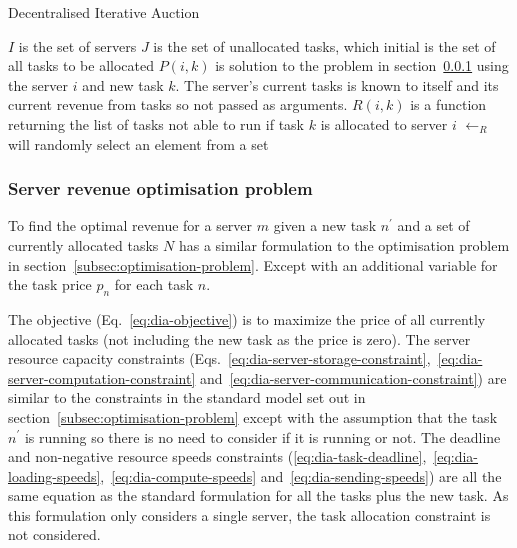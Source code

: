 \begin{algorithm}
    \caption{Decentralised Iterative Auction}
    \label{alg:dia}
    \begin{algorithmic}
        \REQUIRE $I$ is the set of servers
        \REQUIRE $J$ is the set of unallocated tasks, which initial is the set of all tasks to be allocated
        \REQUIRE $P(i, k)$ is solution to the problem in section~\ref{subsubsec:decentralised-iterative-problem}
        using the server $i$ and new task $k$.
        The server's current tasks is known to itself and its current revenue from tasks so not passed as arguments.
        \REQUIRE $R(i, k)$ is a function returning the list of tasks not able to run if task $k$ is allocated to server $i$
        \REQUIRE $\leftarrow_R$ will randomly select an element from a set
                \ENDFOR
            \ENDIF
        \ENDWHILE
    \end{algorithmic}
\end{algorithm}

\subsubsection{Server revenue optimisation problem}
\label{subsubsec:decentralised-iterative-problem}
To find the optimal revenue for a server $m$ given a new task $n^{'}$ and a set of currently allocated tasks $N$ has a
similar formulation to the optimisation problem in section~\ref{subsec:optimisation-problem}. Except with an additional
variable for the task price $p_n$ for each task $n$.

The objective (Eq.~\eqref{eq:dia-objective}) is to maximize the price of all currently allocated tasks (not including
the new task as the price is zero). The server resource capacity constraints
(Eqs.~\eqref{eq:dia-server-storage-constraint},~\eqref{eq:dia-server-computation-constraint}
and~\eqref{eq:dia-server-communication-constraint}) are similar to the constraints in the standard model set out in
section~\ref{subsec:optimisation-problem} except with the assumption that the task $n^{'}$ is running so there is no
need to consider if it is running or not. The deadline and non-negative resource speeds constraints
(\ref{eq:dia-task-deadline},~\ref{eq:dia-loading-speeds},~\ref{eq:dia-compute-speeds} and~\ref{eq:dia-sending-speeds})
are all the same equation as the standard formulation for all the tasks plus the new task. As this formulation only
considers a single server, the task allocation constraint is not considered.

